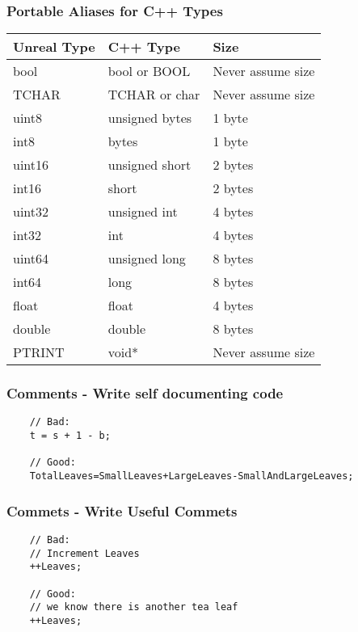 \begin{frame}
  \frametitle{Portable Aliases for C++ Types}
  \begin{table}
      \begin{tabular}{ | l | l | l | }
        \hline
        \textbf{Unreal Type} & \textbf{C++ Type} & \textbf{Size} \\
        \hline
        bool & bool or BOOL & Never assume size \\
        \hline
        TCHAR & TCHAR or char & Never assume size \\
        \hline
        uint8 & unsigned bytes & 1 byte \\
        \hline
        int8 & bytes & 1 byte \\
        \hline
        uint16 & unsigned short & 2 bytes \\
        \hline
        int16 & short & 2 bytes \\
        \hline
        uint32 & unsigned int & 4 bytes \\
        \hline
        int32 & int & 4 bytes \\
        \hline
        uint64 & unsigned long & 8 bytes \\
        \hline
        int64 & long & 8 bytes \\
        \hline
        float & float & 4 bytes \\
        \hline
        double & double & 8 bytes \\
        \hline
        PTRINT & void* & Never assume size \\
        \hline
      \end{tabular}
    \end{table}
\end{frame}

\begin{frame}[fragile]
  \frametitle{Comments - Write self documenting code}
  \begin{lstlisting}
    // Bad:
    t = s + 1 - b;

    // Good:
    TotalLeaves=SmallLeaves+LargeLeaves-SmallAndLargeLeaves;
  \end{lstlisting}
\end{frame}

\begin{frame}[fragile]
  \frametitle{Commets - Write Useful Commets}
  \begin{lstlisting}
    // Bad:
    // Increment Leaves
    ++Leaves;

    // Good:
    // we know there is another tea leaf
    ++Leaves;
  \end{lstlisting}
\end{frame}

